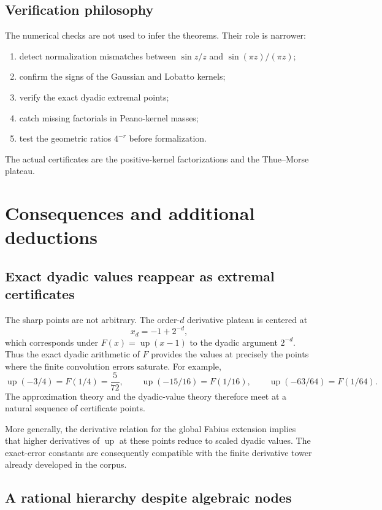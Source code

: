 \documentclass[11pt]{article}
\numberwithin{equation}{section}
\theoremstyle{definition}
\theoremstyle{remark}
\newcommand{\Up}{\operatorname{up}}
\begin{document}
\subsection{Verification philosophy}

The numerical checks are not used to infer the theorems.  Their role is narrower:
\begin{enumerate}
\item detect normalization mismatches between $\sin z/z$ and $\sin(\pi z)/(\pi z)$;
\item confirm the signs of the Gaussian and Lobatto kernels;
\item verify the exact dyadic extremal points;
\item catch missing factorials in Peano-kernel masses;
\item test the geometric ratios $4^{-r}$ before formalization.
\end{enumerate}
The actual certificates are the positive-kernel factorizations and the Thue--Morse plateau.

\section{Consequences and additional deductions}
\label{p1:sec:consequences}

\subsection{Exact dyadic values reappear as extremal certificates}

The sharp points are not arbitrary.  The order-$d$ derivative plateau is centered at
\[
 x_d=-1+2^{-d},
\]
which corresponds under $F(x)=\Up(x-1)$ to the dyadic argument $2^{-d}$.  Thus the exact dyadic arithmetic of $F$ provides the values at precisely the points where the finite convolution errors saturate.  For example,
\[
 \Up(-3/4)=F(1/4)=\frac5{72},
 \qquad
 \Up(-15/16)=F(1/16),
 \qquad
 \Up(-63/64)=F(1/64).
\]
The approximation theory and the dyadic-value theory therefore meet at a natural sequence of certificate points.

More generally, the derivative relation for the global Fabius extension implies that higher derivatives of $\Up$ at these points reduce to scaled dyadic values.  The exact-error constants are consequently compatible with the finite derivative tower already developed in the corpus.

\subsection{A rational hierarchy despite algebraic nodes}
\end{document}
